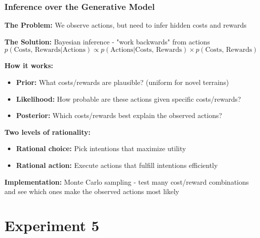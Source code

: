 \documentclass{beamer}
\begin{document}
\begin{frame}
\frametitle{Inference over the Generative Model}
\textbf{The Problem:} We observe actions, but need to infer hidden costs and rewards

\vspace{0.3cm}
\textbf{The Solution:} Bayesian inference - "work backwards" from actions
$$p(\text{Costs, Rewards}|\text{Actions}) \propto p(\text{Actions}|\text{Costs, Rewards}) \times p(\text{Costs, Rewards})$$

\vspace{0.3cm}
\textbf{How it works:}
\begin{itemize}
    \item \textbf{Prior:} What costs/rewards are plausible? (uniform for novel terrains)
    \item \textbf{Likelihood:} How probable are these actions given specific costs/rewards?
    \item \textbf{Posterior:} Which costs/rewards best explain the observed actions?
\end{itemize}

\vspace{0.3cm}
\textbf{Two levels of rationality:}
\begin{itemize}
    \item \textbf{Rational choice:} Pick intentions that maximize utility
    \item \textbf{Rational action:} Execute actions that fulfill intentions efficiently
\end{itemize}

\vspace{0.2cm}
\textbf{Implementation:} Monte Carlo sampling - test many cost/reward combinations and see which ones make the observed actions most likely
\end{frame}

\section{Experiment 5}
\end{document}
